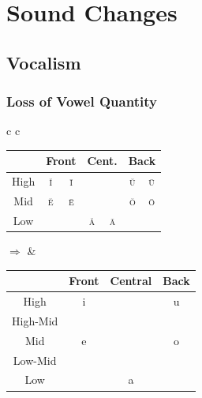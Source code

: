 \documentclass{report}[12pt]
\begin{document}
\section{Sound Changes}

\subsection{Vocalism}

\subsubsection{Loss of Vowel Quantity}\label{sec:loss_of_quantity}

\begin{tcolorbox}
  \begin{tabular}{c c}
    \begin{tabular}{|c|c|c|c|c|c|c|}
      \hline
      & \multicolumn{2}{c|}{Front} & \multicolumn{2}{c|}{Cent.} & \multicolumn{2}{c|}{Back} \\
      \hline
      High & \cellcolor{gray} \textsc{\u{i}} & \textsc{\={i}} & & & \cellcolor{gray} \textsc{\u{u}} & \textsc{\={u}} \\
      \hline
      Mid & \cellcolor{gray} \textsc{\u{e}} & \textsc{\={e}} & & & \cellcolor{gray} \textsc{\u{o}} & \textsc{\={o}} \\
      \hline
      Low &  &  & \cellcolor{gray} \textsc{\u{a}} & \textsc{\={a}} & & \\
      \hline
    \end{tabular}
    \quad $\Rightarrow$ & 
                          \begin{tabular}{|c|c|c|c|}
                            \hline
                            & Front & Central & Back \\
                            \hline
                            High & i & & u \\
                            \hline
                            High-Mid & \cellcolor{magenta} \textipa{I} & & \cellcolor{magenta} \textipa{U} \\
                            \hline
                            Mid & e & & o \\
                            \hline
                            Low-Mid & \cellcolor{magenta} \textipa{E} & & \cellcolor{magenta} \textipa{O} \\
                            \hline
                            Low & & a & \\
                            \hline
                          \end{tabular}
  \end{tabular}
\end{tcolorbox}
\end{document}
